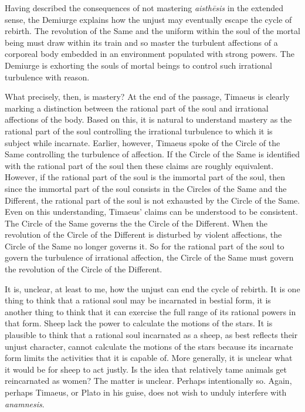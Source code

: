 Having described the consequences of not mastering \emph{aisthēsis} in the extended sense, the Demiurge explains how the unjust may eventually escape the cycle of rebirth. The revolution of the Same and the uniform within the soul of the mortal being must draw within its train and so master the turbulent affections of a corporeal body embedded in an environment populated with strong powers. The Demiurge is exhorting the souls of mortal beings to control such irrational turbulence with reason. 

What precisely, then, is mastery? At the end of the passage, Timaeus is clearly marking a distinction between the rational part of the soul and irrational affections of the body. Based on this, it is natural to understand mastery as the rational part of the soul controlling the irrational turbulence to which it is subject while incarnate. Earlier, however, Timaeus spoke of the Circle of the Same controlling the turbulence of affection. If the Circle of the Same is identified with the rational part of the soul then these claims are roughly equivalent. However, if the rational part of the soul is the immortal part of the soul, then since the immortal part of the soul consists in the Circles of the Same and the Different, the rational part of the soul is not exhausted by the Circle of the Same. Even on this understanding, Timaeus' claims can be understood to be consistent. The Circle of the Same governs the the Circle of the Different. When the revolution of the Circle of the Different is disturbed by violent affections, the Circle of the Same no longer governs it. So for the rational part of the soul to govern the turbulence of irrational affection, the Circle of the Same must govern the revolution of the Circle of the Different.

It is, unclear, at least to me, how the unjust can end the cycle of rebirth. It is one thing to think that a rational soul may be incarnated in bestial form, it is another thing to think that it can exercise the full range of its rational powers in that form. Sheep lack the power to calculate the motions of the stars. It is plausible to think that a rational soul incarnated as a sheep, as best reflects their unjust character, cannot calculate the motions of the stars because its incarnate form limits the activities that it is capable of. More generally, it is unclear what it would be for sheep to act justly. Is the idea that relatively tame animals get reincarnated as women? The matter is unclear. Perhaps intentionally so. Again, perhaps Timaeus, or Plato in his guise, does not wish to unduly interfere with \emph{anamnesis}.

